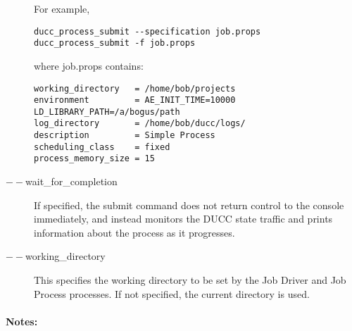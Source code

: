 \begin{description}
          For example, 
\begin{verbatim}
ducc_process_submit --specification job.props 
ducc_process_submit -f job.props 
\end{verbatim}

          where job.props contains: 
\begin{verbatim}
working_directory   = /home/bob/projects
environment         = AE_INIT_TIME=10000 LD_LIBRARY_PATH=/a/bogus/path 
log_directory       = /home/bob/ducc/logs/ 
description         = Simple Process
scheduling_class    = fixed 
process_memory_size = 15 
\end{verbatim}

        \item[$--$wait\_for\_completion ] If specified, the submit command does not return control to
          the console immediately, and instead monitors the DUCC state traffic and prints
          information about the process as it progresses.
          
        \item[$--$working\_directory ] This specifies the working directory to be set by the Job
          Driver and Job Process processes.  If not specified, the current directory is used.

     \end{description}
        
    \paragraph{Notes:}

